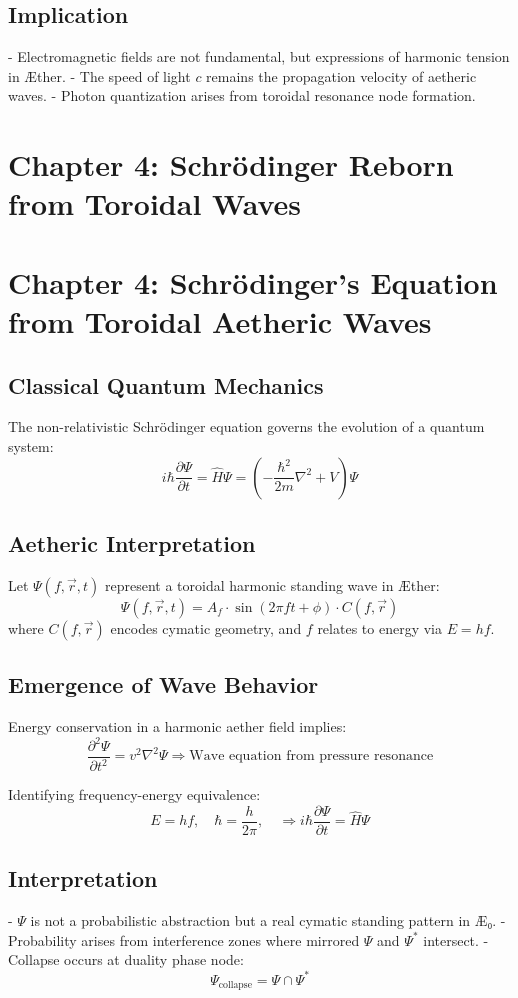 \documentclass[12pt]{book}
\begin{document}
\subsection*{Implication}
- Electromagnetic fields are not fundamental, but expressions of harmonic tension in Æther.
- The speed of light $c$ remains the propagation velocity of aetheric waves.
- Photon quantization arises from toroidal resonance node formation.



\section*{Chapter 4: Schrödinger Reborn from Toroidal Waves}


\section*{Chapter 4: Schrödinger’s Equation from Toroidal Aetheric Waves}

\subsection*{Classical Quantum Mechanics}
The non-relativistic Schrödinger equation governs the evolution of a quantum system:
\[
i \hbar \frac{\partial \Psi}{\partial t} = \hat{H} \Psi = \left( -\frac{\hbar^2}{2m} \nabla^2 + V \right) \Psi
\]

\subsection*{Aetheric Interpretation}
Let $\Psi(f, \vec{r}, t)$ represent a toroidal harmonic standing wave in Æther:
\[
\Psi(f, \vec{r}, t) = A_f \cdot \sin(2\pi f t + \phi) \cdot C(f, \vec{r})
\]
where $C(f, \vec{r})$ encodes cymatic geometry, and $f$ relates to energy via $E = hf$.

\subsection*{Emergence of Wave Behavior}
Energy conservation in a harmonic aether field implies:
\[
\frac{\partial^2 \Psi}{\partial t^2} = v^2 \nabla^2 \Psi
\Rightarrow \text{Wave equation from pressure resonance}
\]

Identifying frequency-energy equivalence:
\[
E = hf, \quad \hbar = \frac{h}{2\pi}, \quad \Rightarrow i\hbar \frac{\partial \Psi}{\partial t} = \hat{H} \Psi
\]

\subsection*{Interpretation}
- $\Psi$ is not a probabilistic abstraction but a real cymatic standing pattern in Æ₀.
- Probability arises from interference zones where mirrored $\Psi$ and $\Psi^*$ intersect.
- Collapse occurs at duality phase node:
\[
\Psi_{\text{collapse}} = \Psi \cap \Psi^*
\]
\end{document}
